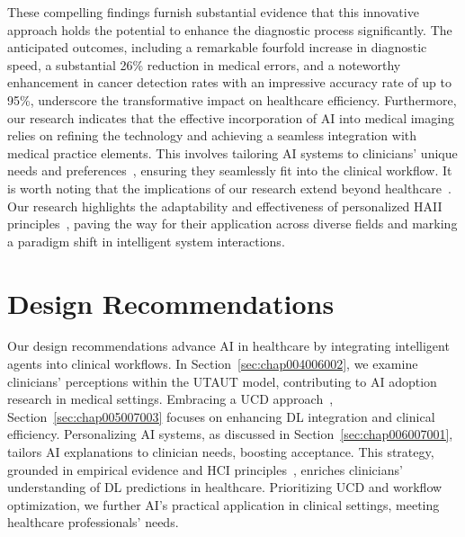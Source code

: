 \vspace{1.00mm}

\textcolor{revised}{These compelling findings furnish substantial evidence that this innovative approach holds the potential to enhance the diagnostic process significantly.
The anticipated outcomes, including a remarkable fourfold increase in diagnostic speed, a substantial 26\% reduction in medical errors, and a noteworthy enhancement in cancer detection rates with an impressive accuracy rate of up to 95\%, underscore the transformative impact on healthcare efficiency.
Furthermore, our research indicates that the effective incorporation of \ac{AI} into medical imaging relies on refining the technology and achieving a seamless integration with medical practice elements.
This involves tailoring \ac{AI} systems to clinicians' unique needs and preferences~\cite{10.1145/3411764.3445385}, ensuring they seamlessly fit into the clinical workflow.
It is worth noting that the implications of our research extend beyond healthcare~\cite{PELAU2021106855}.
Our research highlights the adaptability and effectiveness of personalized \ac{HAII} principles~\cite{10.1145/3290605.3300233}, paving the way for their application across diverse fields and marking a paradigm shift in intelligent system interactions.}

\section{Design Recommendations}
\label{sec:chap007003}

\textcolor{revised}{Our design recommendations advance \ac{AI} in healthcare by integrating intelligent agents into clinical workflows.
In Section~\ref{sec:chap004006002}, we examine clinicians' perceptions within the \ac{UTAUT} model, contributing to \ac{AI} adoption research in medical settings.
Embracing a \ac{UCD} approach~\cite{10.1145/3313831.3376718}, Section~\ref{sec:chap005007003} focuses on enhancing \ac{DL} integration and clinical efficiency.
Personalizing \ac{AI} systems, as discussed in Section~\ref{sec:chap006007001}, tailors \ac{AI} explanations to clinician needs, boosting acceptance.
This strategy, grounded in empirical evidence and \ac{HCI} principles~\cite{PELAU2021106855, 10.1145/3290605.3300233}, enriches clinicians' understanding of \ac{DL} predictions in healthcare.
Prioritizing \ac{UCD} and workflow optimization, we further \ac{AI}'s practical application in clinical settings, meeting healthcare professionals' needs.}

